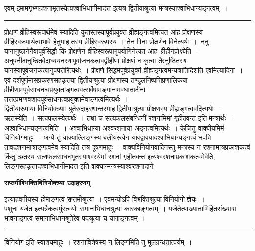 \documentclass[11pt, openany]{book}
\begin{document}
{\bl एवम् {\qtl इमामगृभ्णन्रशनामृतस्येत्यश्वाभिधानीमादत्त} इत्यत्र द्वितीयाश्रुत्या मन्त्रस्याश्वाभिधान्यङ्गत्वम्~।}\\
\hrule
\vspace{3mm}
\noindent
प्रोक्षणं व्रीहिस्वरूपार्थमेव स्यादिति कुतस्तस्यापूर्वप्रयुक्तं व्रीह्यङ्गत्वमित्यत आह प्रोक्षणस्य व्रीहिस्वरूपार्थत्वाभावे हेतुमाह तस्य व्रीहिस्वरूपस्य~। तेन विना प्रोक्षणेन विनेत्यर्थः~।~{\br ननु} यागानुष्ठानेनैवापूर्वसिद्धौ किं प्रोक्षणेन व्रीहिस्वरूपानुपयोगिनेत्यत आह\textemdash\ {\br व्रीहीनप्रोक्ष्येति~।} अनुपनीतानुष्ठितवेदाध्ययनस्यापूर्वाजनकत्ववद्व्रीहीणां प्रोक्षणं न कृत्वा तैरनुष्ठितस्य यागस्यापूर्वजनकत्वानुपपत्तेरित्यर्थः~। प्रोक्षणे
सिद्धमपूर्वप्रयुक्तं व्रीह्यङ्गत्वमन्यत्रातिदिशति {\br एवमित्यादिना~।} एवं दर्शपूर्णमासप्रकरणसहकृतया द्वितीयाश्रुत्या प्रोक्षणस्य तण्डुलनिष्पत्तिप्रणालिकया व्रीहीणामपूर्वसाधनत्वप्रयुक्ताङ्गत्ववत्सर्वेषामङ्गानामवघातादीनां तत्तत्प्रमाणवशादपूर्वसाधनत्वप्रयुक्तमेवाङ्गत्वमित्यर्थः~।\\

 द्वितीयारूपाया विनियोक्त्र्याः श्रुतेरुदाहरणान्तरमाह द्वितीयाश्रुत्या प्रोक्षणस्य व्रीह्यङ्गत्ववदित्यर्थः~। {\br ऋतस्येति~।} सत्यफलस्येत्यर्थः~। तथा च सत्यफलसंबन्धिनीं  रशनामिमां गृहीतवन्त इति मन्त्रार्थः~। {\br अश्वाभिधान्यङ्गत्वमिति~।} अश्वाभिधान्या अश्वरशनाया अङ्गत्वमित्यर्थः~। केचित्तु वाक्यीयमिमं विनियोगमाहुः~। अन्ये तु वाक्याल्लिङ्गस्य बलीयस्त्वेन यावद्वाक्यादश्वाभिधान्यङ्गत्वं भवति तावद्रशनामात्राङ्गत्वमेव स्यादिति तत्र दूषणमाहुः~। वाक्यविनियोगवादिनस्तु मन्त्रस्य न रशनामात्रप्रकाशकत्वं किंतु ऋतस्य सत्यफलसाधनभूतस्याश्वस्येमां रशनां गृहीतवन्त इत्यश्वरशनाप्रकाशकत्वमेवेति,  लिङ्गसहकृतादश्वाभिधानीमादत्त इति वाक्यान्मन्त्रस्याश्वरशनादाने
\newpage
\fancyhead[LO]{[ स०वि०उदा० ]}
\begin{center}
\textbf{सप्तमीविभक्तिविनियोक्त्र्या उदाहरणम् }    
\end{center}

{ इत्याहवनीयस्य होमाङ्गत्वं सप्तमीश्रुत्या~। एवमन्योऽपि विभक्तिश्रुत्या विनियोगो ज्ञेयः~।\\

{\qtl पशुना यजेत} इत्यत्रैकत्वपुंस्त्वयोः समानाभिधानश्रुत्या कारकाङ्गत्वम्~। यजेतेत्याख्याताभिहितसंख्याया भा\footnotemark वनाङ्गत्वं समानाभिधानश्रुतेरेव
पदश्रुत्या च यागाङ्गत्वम्~।}\\
\hrule
\vspace{3mm}
\noindent
विनियोग इति स्वाशयमाहुः~। रशनाविशेषस्य न लिङ्गमिति तु मूलग्रन्थतात्पर्यम्~।\\
\end{document}
